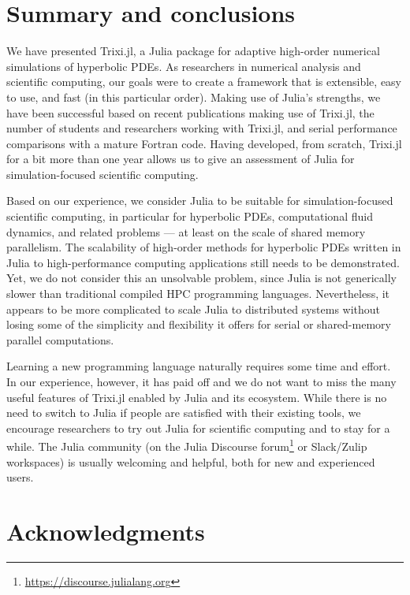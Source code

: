 \documentclass[hidelinks]{juliacon} %
\newcommand{\trixi}{Trixi.jl\xspace}
\begin{document}
\section{Summary and conclusions}
\label{sec:summary}

We have presented \trixi, a Julia package for adaptive high-order numerical
simulations of hyperbolic PDEs. As researchers in numerical analysis and
scientific computing, our goals were to create a framework that is extensible,
easy to use, and fast (in this particular order). Making use of Julia's strengths,
we have been successful based on recent publications making use of \trixi,
the number of students and researchers working with \trixi, and serial performance
comparisons with a mature Fortran code. Having developed, from scratch, \trixi for a bit
more than one year allows us to give an assessment of Julia for simulation-focused
scientific computing.

Based on our experience, we consider Julia to be suitable for simulation-focused
scientific computing, in particular for hyperbolic PDEs, computational fluid
dynamics, and related problems --- at least on the scale of shared memory
parallelism. The scalability of high-order methods for hyperbolic PDEs written
in Julia to high-performance computing applications still needs to be demonstrated.
Yet, we do not consider this an unsolvable problem, since Julia is not
generically slower than traditional compiled HPC programming languages. Nevertheless,
it appears to be more complicated to scale Julia to distributed systems without losing some of the
simplicity and flexibility it offers for serial or shared-memory parallel computations.

Learning a new programming language naturally requires some time and effort.
In our experience, however, it has paid off and we do not want to miss the
many useful features of \trixi enabled by Julia and its ecosystem. While there is
no need to switch to Julia if people are satisfied with their existing
tools, we encourage researchers to try out Julia for scientific computing and to stay for a while.
The Julia
community (on the Julia Discourse forum\footnote{\url{https://discourse.julialang.org}}
or Slack/Zulip workspaces) is usually welcoming and helpful, both for new and
experienced users.



\section*{Acknowledgments}
\end{document}

